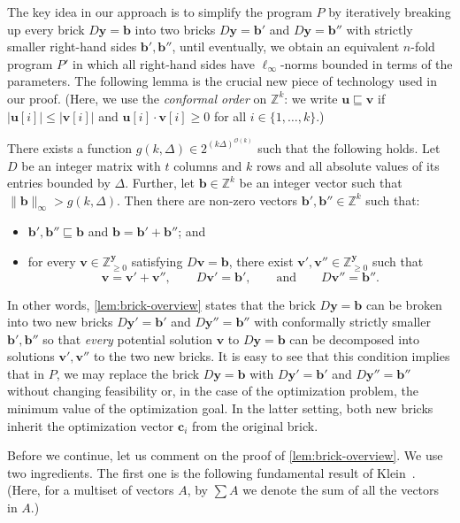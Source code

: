 \documentclass{theoretics}
\renewcommand{\leq}{\leqslant}
\renewcommand{\geq}{\geqslant}
\newcommand{\cfleq}{\sqsubseteq}
\newcommand{\Z}{\mathbb{Z}}
\newcommand{\Zn}{\Z_{\geq 0}}
\newcommand{\tup}[1]{{\mathbf{#1}}}
\newcommand{\yy}{\tup y}
\newcommand{\bb}{\tup b}
\newcommand{\cc}{\tup c}
\newcommand{\uu}{\tup u}
\newcommand{\myvv}{\tup v} %
\newcommand{\Oh}{{\mathcal{O}}}
\begin{document}
The key idea in our approach is to simplify the program $P$ by iteratively breaking up every brick $D\yy=\bb$ into two bricks $D\yy=\bb'$ and $D\yy=\bb''$ with strictly smaller right-hand sides $\bb',\bb''$, until eventually, we obtain an equivalent $n$-fold program $P'$ in which all right-hand sides have  $\ell_\infty$-norms bounded in terms of the parameters. The following lemma is the crucial new piece of technology used in our proof. (Here, we use the {\em{conformal order}} on $\Z^k$: we write $\uu\cfleq \myvv$ if $|\uu[i]|\leq |\myvv[i]|$ and $\uu[i]\cdot\myvv[i]\geq 0$ for all $i\in \{1,\ldots,k\}$.)

\begin{lemma}\label{lem:brick-overview}
There exists a function $g(k,\Delta)\in 2^{(k\Delta)^{\Oh(k)}}$ such that the following holds. Let $D$ be an integer matrix with $t$ columns and $k$ rows and all absolute values of its entries bounded by $\Delta$. Further, let $\bb\in \Z^{k}$ be an integer vector such that $\|\bb\|_\infty>g(k,\Delta)$. Then there are non-zero vectors $\bb',\bb''\in \Z^k$ such that:
\begin{itemize}[nosep]
    \item $\bb',\bb''\cfleq \bb$ and $\bb=\bb'+\bb''$; and
    \item for every $\myvv\in \Zn^{\yy}$ satisfying $D\myvv=\bb$, there exist $\myvv',\myvv''\in \Zn^{\yy}$ such that
    $$\myvv=\myvv'+\myvv'',\qquad D\myvv'=\bb',\qquad\textrm{and}\qquad  D\myvv''=\bb''.$$
\end{itemize}
\end{lemma}

In other words, \cref{lem:brick-overview} states that the brick $D\yy=\bb$ can be broken into two new bricks $D\yy'=\bb'$ and $D\yy''=\bb''$ with conformally strictly smaller $\bb',\bb''$ so that {\em{every}} potential solution $\myvv$ to $D\yy=\bb$ can be decomposed into solutions $\myvv',\myvv''$ to the two new bricks. It is easy to see that this condition implies that in $P$, we may replace the brick $D\yy=\bb$ with $D\yy'=\bb'$ and $D\yy''=\bb''$ without changing feasibility or, in the case of the optimization problem, the minimum value of the optimization goal. In the latter setting, both new bricks inherit the optimization vector $\cc_i$ from the original brick.

Before we continue, let us comment on the proof of \cref{lem:brick-overview}. We use two ingredients. The first one is the following fundamental result of Klein~\cite{DBLP:journals/mp/Klein22}. (Here, for a multiset of vectors $A$, by $\sum A$ we denote the sum of all the vectors in $A$.)
\end{document}
